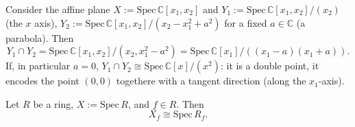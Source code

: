 \begin{ex}
	Consider the affine plane $X := \mathrm{Spec}\, \mathbb{C}[x_1,x_2]$
	and $Y_1 := \mathrm{Spec}\, \mathbb{C}[x_1,x_2]/ (x_2)$ (the $x$ axis),
	$Y_2 := \mathrm{Spec}\, \mathbb{C}[x_1,x_2]/ (x_2 - x_1^2+a^2)$ for a fixed $a \in \mathbb{C}$ (a parabola).
	Then
	\begin{equation}
	Y_1 \cap Y_2 =
	\mathrm{Spec}\, \mathbb{C}[x_1,x_2]/ (x_2, x_1^2-a^2) =
	\mathrm{Spec}\, \mathbb{C}[x_1]/ ( (x_1-a)(x_1+a))
	.\end{equation} 
	If, in particular $a=0$, $Y_1 \cap Y_2 \cong \mathrm{Spec}\, \mathbb{C}[x]/ (x^2)$:
	it is a double point, it encodes the point $(0,0)$ togethere with a tangent direction
	(along the $x_1$-axis).
\end{ex} 

\begin{lem}
	Let $R$ be a ring, $X := \mathrm{Spec}\, R$, and $f \in R$.
	Then
	\begin{equation}
	X_f \cong \mathrm{Spec}\, R_f
	.\end{equation} 
\end{lem} 
